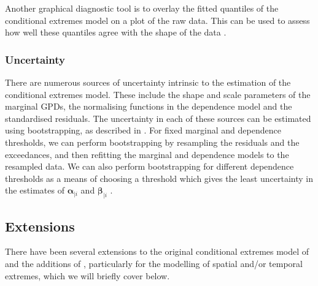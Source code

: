 \documentclass{article}
\numberwithin{equation}{section}
\begin{document}
Another graphical diagnostic tool is to overlay the fitted quantiles of the conditional extremes model on a plot of the raw data. 
This can be used to assess how well these quantiles agree with the shape of the data \citep{Southworth2024_vignette}.


\subsubsection{Uncertainty} \label{subsubsec:ce_uncertainty}


There are numerous sources of uncertainty intrinsic to the estimation of the conditional extremes model.
These include the shape and scale parameters of the marginal GPDs, the normalising functions in the dependence model and the standardised residuals. 
The uncertainty in each of these sources can be estimated using bootstrapping, as described in \citet{Heffernan2004}.
For fixed marginal and dependence thresholds, we can perform bootstrapping by resampling the residuals and the exceedances, and then refitting the marginal and dependence models to the resampled data.
We can also perform bootstrapping for different dependence thresholds as a means of choosing a threshold which gives the least uncertainty in the estimates of $\bm{\alpha}_{\mid i}$ and $\bm{\beta}_{\mid i}$ \citep{Southworth2024_vignette}.

\subsection{Extensions} \label{subsec:extensions}

There have been several extensions to the original conditional extremes model of \citet{Heffernan2004} and the additions of \citet{Keef2013}, particularly for the modelling of spatial and/or temporal extremes, which we will briefly cover below. 
\end{document}
